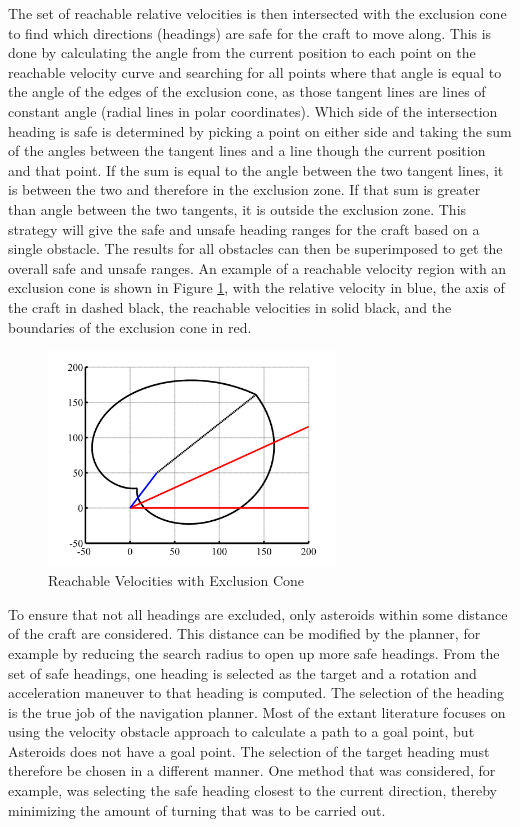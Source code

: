 \documentclass[10pt,draft,conference]{IEEEtran}
\begin{document}
The set of reachable relative velocities is then intersected with the exclusion cone to find which directions (headings) are safe for the craft to move along. This is done by calculating the angle from the current position to each point on the reachable velocity curve and searching for all points where that angle is equal to the angle of the edges of the exclusion cone, as those tangent lines are lines of constant angle (radial lines in polar coordinates). Which side of the intersection heading is safe is determined by picking a point on either side and taking the sum of the angles between the tangent lines and a line though the current position and that point. If the sum is equal to the angle between the two tangent lines, it is between the two and therefore in the exclusion zone. If that sum is greater than angle between the two tangents, it is outside the exclusion zone. This strategy will give the safe and unsafe heading ranges for the craft based on a single obstacle. The results for all obstacles can then be superimposed to get the overall safe and unsafe ranges. An example of a reachable velocity region with an exclusion cone is shown in Figure \ref{fig:reachable_veloc}, with the relative velocity in blue, the axis of the craft in dashed black, the reachable velocities in solid black, and the boundaries of the exclusion cone in red.

\begin{figure}[ht]
\centering
\includegraphics[width=3in]{./deltav_curve_rotated_translated_obstacle_color.png}
\caption{Reachable Velocities with Exclusion Cone}
\label{fig:reachable_veloc}
\end{figure}

To ensure that not all headings are excluded, only asteroids within some distance of the craft are considered. This distance can be modified by the planner, for example by reducing the search radius to open up more safe headings. From the set of safe headings, one heading is selected as the target and a rotation and acceleration maneuver to that heading is computed. The selection of the heading is the true job of the navigation planner. Most of the extant literature focuses on using the velocity obstacle approach to calculate a path to a goal point, but Asteroids does not have a goal point. The selection of the target heading must therefore be chosen in a different manner. One method that was considered, for example, was selecting the safe heading closest to the current direction, thereby minimizing the amount of turning that was to be carried out.
\end{document}
